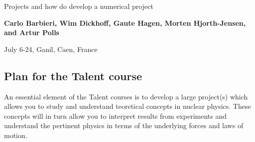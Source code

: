 \documentclass[%
twoside,                 %
final,                   %
10pt]{article}
\begin{document}






\thispagestyle{empty}

\begin{center}
{\LARGE\bf
\begin{spacing}{1.25}
Projects and how do develop a numerical project
\end{spacing}
}
\end{center}


\begin{center}
{\bf Carlo Barbieri, Wim Dickhoff, Gaute Hagen, Morten Hjorth-Jensen, and Artur Polls${}^{}$} \\ [0mm]
\end{center}

    \begin{center}
\end{center}
    

\begin{center} %
July 6-24, Ganil, Caen, France
\end{center}

\vspace{1cm}


\tableofcontents


\vspace{1cm} %




\subsection{Plan for the Talent course}
An essential element of the Talent courses is to develop a large project(s) which allows you to study and understand
teoretical concepts in nuclear physics.  
These concepts will in turn allow you to interpret results from experiments and understand the pertinent physics in terms of the underlying forces and laws of motion.
\end{document}
